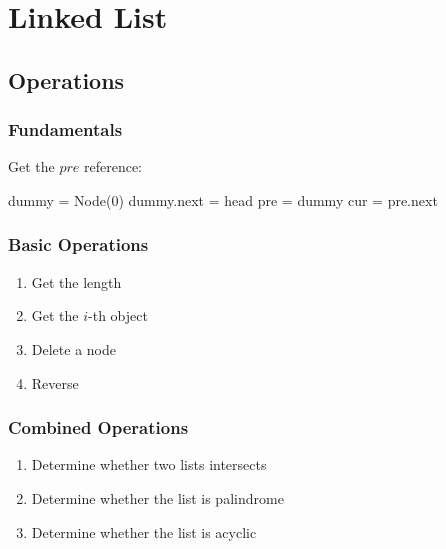 \chapter{Linked List}


\section{Operations}
\subsection{Fundamentals}
Get the $pre$ reference:
\begin{python}
dummy = Node(0)
dummy.next = head
pre = dummy
cur = pre.next
\end{python}

\subsection{Basic Operations}
\begin{enumerate}
\item Get the length
\item Get the $i$-th object
\item Delete a node 
\item Reverse
\end{enumerate}

\subsection{Combined Operations}
\begin{enumerate}
\item Determine whether two lists intersects
\item Determine whether the list is palindrome
\item Determine whether the list is acyclic 
\end{enumerate}
